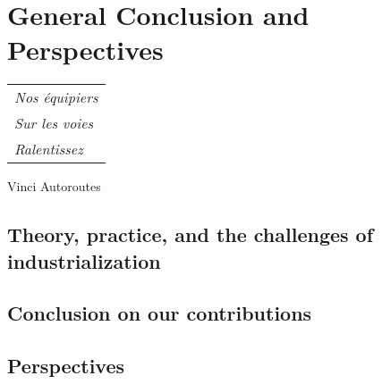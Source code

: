 
\chapter{General Conclusion and Perspectives}
\label{chapter:conclusion}

\begin{flushright}
	\begin{tabular}{@{}l@{}}
		\emph{Nos équipiers}\\
		\emph{\hspace*{1.0cm}Sur les voies}\\
		\emph{\hspace*{0.5cm}Ralentissez}\\
	\end{tabular}

	{Vinci Autoroutes}\hspace*{1cm}
\end{flushright}



\section{Theory, practice, and the challenges of industrialization}
\section{Conclusion on our contributions}
\section{Perspectives}
